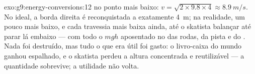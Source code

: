 \begin{solution}{exo:g9:energy-conversions:12}
 no ponto mais baixo:
$v = \sqrt{2 \times 9.8 \times 4} \approx \qty{8.9}{m/s}$. No ideal,
a borda direita é reconquistada a exatamente \qty{4}{m}; na
realidade, um pouco mais baixo, e cada travessia mais baixa ainda,
até o skatista balançar até parar lá embaixo --- com todo o $m g h$
aposentado no  das rodas, da pista e do . Nada foi destruído,
mas tudo o que era útil foi gasto: o livro-caixa do mundo ganhou
 espalhado, e o skatista perdeu a altura concentrada e
reutilizável --- a quantidade sobrevive; a utilidade não volta.
\end{solution}

